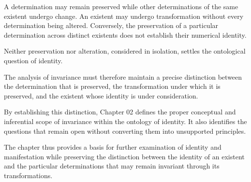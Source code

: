 A determination may remain preserved while other
determinations of the same existent undergo change.
An existent may undergo transformation without
every determination being altered. Conversely,
the preservation of a particular determination
across distinct existents does not establish
their numerical identity.

Neither preservation nor alteration, considered
in isolation, settles the ontological question
of identity.

The analysis of invariance must therefore maintain
a precise distinction between the determination
that is preserved, the transformation under which
it is preserved, and the existent whose identity
is under consideration.

By establishing this distinction, Chapter 02
defines the proper conceptual and inferential
scope of invariance within the ontology of identity.
It also identifies the questions that remain open
without converting them into unsupported principles.

The chapter thus provides a basis for further
examination of identity and manifestation while
preserving the distinction between the identity
of an existent and the particular determinations
that may remain invariant through its transformations.

